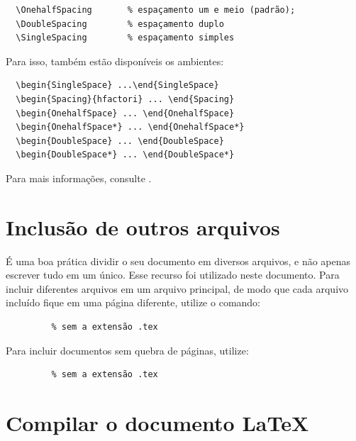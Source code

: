 \begin{verbatim}
  \OnehalfSpacing       % espaçamento um e meio (padrão); 
  \DoubleSpacing        % espaçamento duplo
  \SingleSpacing        % espaçamento simples	
\end{verbatim}

Para isso, também estão disponíveis os ambientes:

\begin{verbatim}
  \begin{SingleSpace} ...\end{SingleSpace}
  \begin{Spacing}{hfactori} ... \end{Spacing}
  \begin{OnehalfSpace} ... \end{OnehalfSpace}
  \begin{OnehalfSpace*} ... \end{OnehalfSpace*}
  \begin{DoubleSpace} ... \end{DoubleSpace}
  \begin{DoubleSpace*} ... \end{DoubleSpace*} 
\end{verbatim}

Para mais informações, consulte \textcite{memoir}.

\section{Inclusão de outros arquivos}\label{sec-include}

É uma boa prática dividir o seu documento em diversos arquivos, e não
apenas escrever tudo em um único. Esse recurso foi utilizado neste
documento. Para incluir diferentes arquivos em um arquivo principal,
de modo que cada arquivo incluído fique em uma página diferente, utilize o
comando:

\begin{verbatim}
         % sem a extensão .tex
\end{verbatim}

Para incluir documentos sem quebra de páginas, utilize:

\begin{verbatim}
         % sem a extensão .tex
\end{verbatim}

\section{Compilar o documento \LaTeX}

